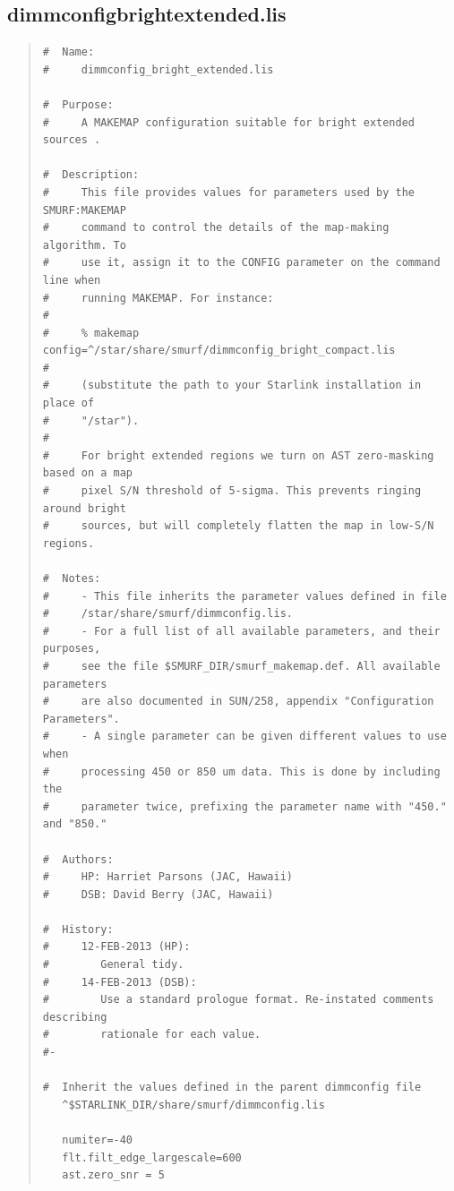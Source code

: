 \documentclass[twoside,11pt]{article}
\renewcommand{\_}{\texttt{\symbol{95}}}
\newenvironment{myquote}{\begin{quote}\begin{small}}{\end{small}\end{quote}}
\begin{document}
\subsection{dimmconfig\_bright\_extended.lis}
\begin{myquote}
\begin{verbatim}
#  Name:
#     dimmconfig_bright_extended.lis

#  Purpose:
#     A MAKEMAP configuration suitable for bright extended sources .

#  Description:
#     This file provides values for parameters used by the SMURF:MAKEMAP
#     command to control the details of the map-making algorithm. To
#     use it, assign it to the CONFIG parameter on the command line when
#     running MAKEMAP. For instance:
#
#     % makemap config=^/star/share/smurf/dimmconfig_bright_compact.lis
#
#     (substitute the path to your Starlink installation in place of
#     "/star").
#
#     For bright extended regions we turn on AST zero-masking based on a map
#     pixel S/N threshold of 5-sigma. This prevents ringing around bright
#     sources, but will completely flatten the map in low-S/N regions.

#  Notes:
#     - This file inherits the parameter values defined in file
#     /star/share/smurf/dimmconfig.lis.
#     - For a full list of all available parameters, and their purposes,
#     see the file $SMURF_DIR/smurf_makemap.def. All available parameters
#     are also documented in SUN/258, appendix "Configuration Parameters".
#     - A single parameter can be given different values to use when
#     processing 450 or 850 um data. This is done by including the
#     parameter twice, prefixing the parameter name with "450." and "850."

#  Authors:
#     HP: Harriet Parsons (JAC, Hawaii)
#     DSB: David Berry (JAC, Hawaii)

#  History:
#     12-FEB-2013 (HP):
#        General tidy.
#     14-FEB-2013 (DSB):
#        Use a standard prologue format. Re-instated comments describing
#        rationale for each value.
#-

#  Inherit the values defined in the parent dimmconfig file
   ^$STARLINK_DIR/share/smurf/dimmconfig.lis

   numiter=-40
   flt.filt_edge_largescale=600
   ast.zero_snr = 5
\end{verbatim}
\end{myquote}
\end{document}
